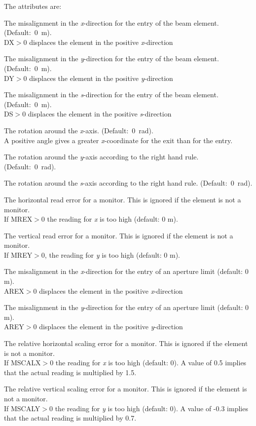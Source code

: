 The attributes are: 
\begin{madlist}
   The misalignment in the \textit{x}-direction for the entry of
  the beam element. (Default:~0~m).  \\ 
  DX$>$0 displaces the element in the positive \textit{x}-direction 
  
   The misalignment in the \textit{y}-direction for the entry of
  the beam element. (Default:~0~m). \\ 
  DY$>$0 displaces the element in the positive \textit{y}-direction 

   The misalignment in the \textit{s}-direction for the entry of
  the beam element. (Default:~0~m). \\
  DS$>$0 displaces the element in the positive \textit{s}-direction 
  
   The rotation around the \textit{x}-axis. (Default:~0~rad). \\ 
  A positive angle gives a greater \textit{x}-coordinate for the exit
  than for the entry. 

   The rotation around the \textit{y}-axis according to the
  right hand rule. (Default:~0~rad).  

   The rotation around the \textit{s}-axis according to the
  right hand rule. (Default:~0~rad).  

   The horizontal read error for a monitor. This is ignored if
  the element is not a monitor. \\
  If MREX$>$0 the reading for \textit{x} is too high (default: 0 m). 

   The vertical read error for a monitor. This is ignored if
  the element is not a monitor. \\  
  If MREY$>$0, the reading for \textit{y} is too high (default: 0 m). 

   The misalignment in the \textit{x}-direction for the entry
  of an aperture limit (default: 0 m). \\ 
  AREX$>$0 displaces the element in the positive \textit{x}-direction 

   The misalignment in the \textit{y}-direction for the entry
  of an aperture limit (default: 0 m). \\ 
  AREY$>$0 displaces the element in the positive \textit{y}-direction 

   The relative horizontal scaling error for a monitor. This
  is ignored if the element is not a monitor. \\ 
  If MSCALX$>$0 the reading for \textit{x} is too high (default: 0). A
  value of 0.5 implies that the actual reading is multiplied by 1.5.  

   The relative vertical scaling error for a monitor. This is
  ignored if the element is not a monitor. \\  
  If MSCALY$>$0 the reading for \textit{y} is too high (default: 0). A
  value of -0.3 implies that the actual reading is multiplied by 0.7.  
\end{madlist}

